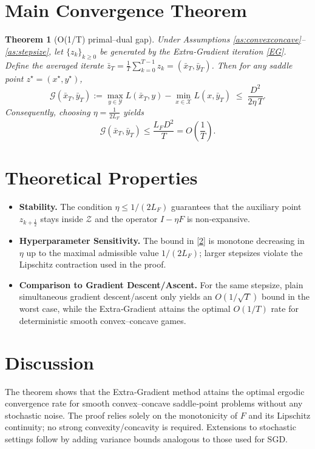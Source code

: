 \documentclass{article}
\newtheorem{theorem}{Theorem}
\newcommand{\gap}{\mathcal{G}}
\begin{document}
\section*{Main Convergence Theorem}
\begin{theorem}[O(1/T) primal–dual gap]\label{thm:main}
Under Assumptions \ref{as:convexconcave}–\ref{as:stepsize}, let $\{z_{k}\}_{k\ge0}$ be generated by the Extra‑Gradient iteration \eqref{EG}.  
Define the averaged iterate $\bar z_{T}=\frac1T\sum_{k=0}^{T-1}z_{k}=(\bar x_{T},\bar y_{T})$.  
Then for any saddle point $z^{\star}=(x^{\star},y^{\star})$,
\[
\gap(\bar x_{T},\bar y_{T})
:=\max_{y\in\mathcal{Y}}L(\bar x_{T},y)-\min_{x\in\mathcal{X}}L(x,\bar y_{T})
\;\le\;
\frac{D^{2}}{2\eta\,T}.
\tag{2}
\]
Consequently, choosing $\eta=\frac{1}{2L_{F}}$ yields
\[
\gap(\bar x_{T},\bar y_{T})\le\frac{L_{F}D^{2}}{T}=O\!\left(\frac{1}{T}\right).
\]
\end{theorem}

\section*{Theoretical Properties}
\begin{itemize}[leftmargin=*]
\item \textbf{Stability.} The condition $\eta\le 1/(2L_{F})$ guarantees that the auxiliary point $z_{k+\frac12}$ stays inside $\mathcal{Z}$ and the operator $I-\eta F$ is non‑expansive.
\item \textbf{Hyperparameter Sensitivity.} The bound in \eqref{2} is monotone decreasing in $\eta$ up to the maximal admissible value $1/(2L_{F})$; larger stepsizes violate the Lipschitz contraction used in the proof.
\item \textbf{Comparison to Gradient Descent/Ascent.} For the same stepsize, plain simultaneous gradient descent/ascent only yields an $O(1/\sqrt{T})$ bound in the worst case, while the Extra‑Gradient attains the optimal $O(1/T)$ rate for deterministic smooth convex–concave games.
\end{itemize}

\section*{Discussion}
The theorem shows that the Extra‑Gradient method attains the optimal ergodic convergence rate for smooth convex–concave saddle‑point problems without any stochastic noise. The proof relies solely on the monotonicity of $F$ and its Lipschitz continuity; no strong convexity/concavity is required. Extensions to stochastic settings follow by adding variance bounds analogous to those used for SGD.
\end{document}
